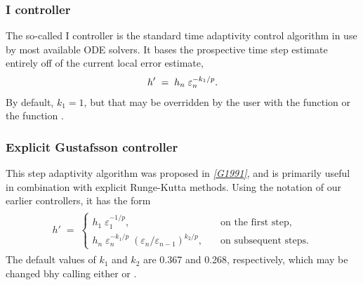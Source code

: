 \documentclass[letterpaper,10pt,english]{sphinxmanual}
\begin{document}
\subsubsection{I controller}
\label{Mathematics:i-controller}\label{Mathematics:mathematics-adaptivity-errorcontrol-i}
The so-called I controller is the standard time adaptivity control
algorithm in use by most available ODE solvers.  It bases the
prospective time step estimate entirely off of the current local error
estimate,
\begin{gather}
\begin{split}h' \;=\; h_n\; \varepsilon_n^{-k_1/p}.\end{split}\notag
\end{gather}
By default, \(k_1=1\), but that may be overridden by the user with
the function {\hyperref[c_interface/User_callable:c.ARKodeSetAdaptivityMethod]{\emph{}}} or the function
{\hyperref[f_interface/Usage:f/_/FARKSETADAPTIVITYMETHOD]{\emph{}}}.


\subsubsection{Explicit Gustafsson controller}
\label{Mathematics:explicit-gustafsson-controller}\label{Mathematics:mathematics-adaptivity-errorcontrol-egus}
This step adaptivity algorithm was proposed in \label{Mathematics:id16}{\hyperref[References:g1991]{\emph{{[}G1991{]}}}}, and
is primarily useful in combination with explicit Runge-Kutta methods.
Using the notation of our earlier controllers, it has the form
\label{Mathematics:equation-expGus}\begin{gather}
\begin{split}h' \;=\; \begin{cases}
   h_1\; \varepsilon_1^{-1/p}, &\quad\text{on the first step}, \\
   h_n\; \varepsilon_n^{-k_1/p}\;
     \left(\varepsilon_n/\varepsilon_{n-1}\right)^{k_2/p}, &
   \quad\text{on subsequent steps}.
\end{cases}\end{split}\label{Mathematics-expGus}
\end{gather}
The default values of \(k_1\) and \(k_2\) are 0.367 and 0.268,
respectively, which may be changed bhy calling either
{\hyperref[c_interface/User_callable:c.ARKodeSetAdaptivityMethod]{\emph{}}} or {\hyperref[f_interface/Usage:f/_/FARKSETADAPTIVITYMETHOD]{\emph{}}}.
\end{document}
